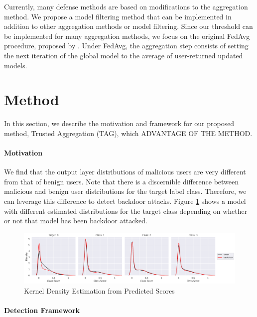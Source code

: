 \documentclass{article} %
\begin{document}
Currently, many defense methods are based on modifications to the aggregation method. We propose a model filtering method that can be implemented in addition to other aggregation methods or model filtering. Since our threshold can be implemented for many aggregation methods, we focus on the original FedAvg procedure, proposed by \cite{fedavg}. Under FedAvg, the aggregation step consists of setting the next iteration of the global model to the average of user-returned updated models. 


%
\section{Method}

In this section, we describe the motivation and framework for our proposed method, Trusted Aggregation (TAG), which ADVANTAGE OF THE METHOD. 

\paragraph{Motivation}

We find that the output layer distributions of malicious users are very different from that of benign users. Note that there is a discernible difference between malicious and benign user distributions for the target label class. Therefore, we can leverage this difference to detect backdoor attacks. Figure \ref{fig:motivation} shows a model with different estimated distributions for the target class depending on whether or not that model has been backdoor attacked. 

\begin{figure}[H]
    \centering
    \includegraphics[width=\textwidth]{make_article/make_visuals/visuals/ext_motivation.png}
    \caption{Kernel Density Estimation from Predicted Scores}
    \label{fig:motivation}
\end{figure}

\paragraph{Detection Framework}
\end{document}

